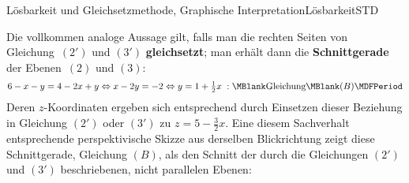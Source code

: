 \begin{MXContent}{Lösbarkeit und Gleichsetzmethode, Graphische Interpretation}{Lösbarkeit}{STD}
\begin{MExample}
\begin{center}
{
}%
\end{center}
Die vollkommen analoge Aussage gilt, falls man die rechten Seiten von Gleichung~$(2')$ und $(3')$ \textbf{gleichsetzt};
man erhält dann die \textbf{Schnittgerade} der Ebenen~$(2)$ und $(3)$:
$$6 - x - y = 4 - 2 x + y \Leftrightarrow x - 2 y = - 2 \Leftrightarrow y = 1 + \Mtfrac12 x \; :
\MBlank\mbox{Gleichung}\MBlank (B) \MDFPeriod $$
Deren $z$-Koordinaten ergeben sich entsprechend durch Einsetzen dieser 
Beziehung in Gleichung $(2')$ oder $(3')$ zu $z=5-\frac{3}{2}x$.
Eine diesem Sachverhalt entsprechende perspektivische Skizze aus derselben
Blickrichtung zeigt diese Schnittgerade, Gleichung $(B)$, als den Schnitt
der durch die Gleichungen $(2')$ und $(3')$ beschriebenen,
nicht parallelen Ebenen:
\begin{center}
\end{center}
\end{MExample}
\end{MXContent}
